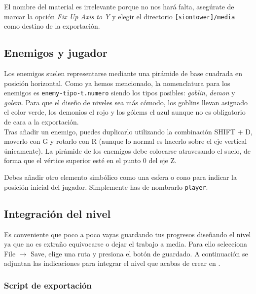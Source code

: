 \documentclass[a4paper,11pt]{article}
\begin{document}

El nombre del material es irrelevante porque no nos hará falta, asegúrate
de marcar la opción \textit{Fix Up Axis to Y} y elegir el directorio
\texttt{[siontower]/media} como destino de la exportación.

\subsection{Enemigos y jugador}

Los enemigos suelen representarse mediante una pirámide de base cuadrada
en posición horizontal. Como ya hemos mencionado, la nomenclatura para los
enemigos es \texttt{enemy-tipo-t.numero} siendo los tipos posibles: \textit{goblin},
\textit{demon} y \textit{golem}. Para que el diseño de niveles sea más cómodo, los goblins
llevan asignado el color verde, los demonios el rojo y los gólems el azul
aunque no es obligatorio de cara a la exportación.\\

Tras añadir un enemigo, puedes duplicarlo utilizando la combinación SHIFT
$+$ D, moverlo con G y rotarlo con R (aunque lo normal es hacerlo sobre
el eje vertical únicamente). La pirámide de los enemigos debe colocarse
atravesando el suelo, de forma que el vértice superior esté en el punto 0
del eje Z.


Debes añadir otro elemento simbólico como una esfera o cono para indicar
la posición inicial del jugador. Simplemente has de nombrarlo \texttt{player}.


\subsection{Integración del nivel}

Es conveniente que poco a poco vayas guardando tus progresos diseñando el
nivel ya que no es extraño equivocarse o dejar el trabajo a media. Para ello
selecciona File $\rightarrow$ Save, elige una ruta y presiona el botón de
guardado. A continuación se adjuntan las indicaciones para integrar el nivel
que acabas de crear en \juego.

\subsubsection{Script de exportación}
\end{document}
